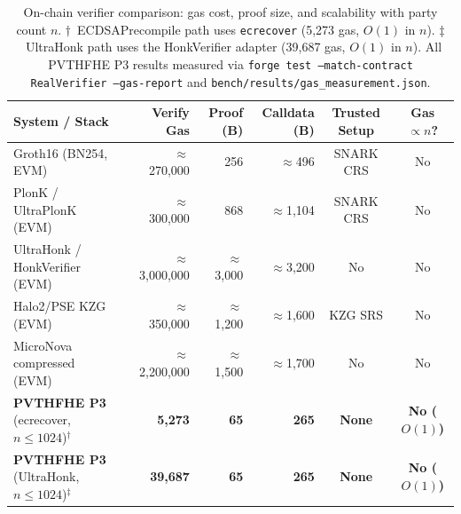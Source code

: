 
\begin{table}[ht]
\centering
\caption{On-chain verifier comparison: gas cost, proof size, and scalability with party count $n$.
  $\dagger$~ECDSAPrecompile path uses \texttt{ecrecover} (5{,}273 gas, $O(1)$ in $n$).
  $\ddagger$~UltraHonk path uses the HonkVerifier adapter (39{,}687 gas, $O(1)$ in $n$).
  All PVTHFHE P3 results measured via \texttt{forge test --match-contract RealVerifier --gas-report}
  and \texttt{bench/results/gas\_measurement.json}.}
\label{tab:p3-bench}
\setlength{\tabcolsep}{6pt}
\begin{tabular}{@{}lrrrcc@{}}
\toprule
\textbf{System / Stack} &
\textbf{Verify Gas} &
\textbf{Proof (B)} &
\textbf{Calldata (B)} &
\textbf{Trusted Setup} &
\textbf{Gas $\propto n$?} \\
\midrule
Groth16 (BN254, EVM)~\cite{groth16}
  & $\approx$270{,}000 & 256  & $\approx$496  & SNARK CRS & No \\
PlonK / UltraPlonK (EVM)~\cite{plonk}
  & $\approx$300{,}000 & 868  & $\approx$1{,}104 & SNARK CRS & No \\
UltraHonk / HonkVerifier (EVM)~\cite{ultraplonk}
  & $\approx$3{,}000{,}000 & $\approx$3{,}000 & $\approx$3{,}200 & No & No \\
Halo2/PSE KZG (EVM)~\cite{halo2}
  & $\approx$350{,}000 & $\approx$1{,}200 & $\approx$1{,}600 & KZG SRS & No \\
MicroNova compressed (EVM)~\cite{micronova}
  & $\approx$2{,}200{,}000 & $\approx$1{,}500 & $\approx$1{,}700 & No & No \\
\midrule
\textbf{PVTHFHE P3} (ecrecover, $n{\le}1024$)$^\dagger$
  & \textbf{5{,}273} & \textbf{65} & \textbf{265} & \textbf{None} & \textbf{No ($O(1)$)} \\
\textbf{PVTHFHE P3} (UltraHonk, $n{\le}1024$)$^\ddagger$
  & \textbf{39{,}687} & \textbf{65} & \textbf{265} & \textbf{None} & \textbf{No ($O(1)$)} \\
\bottomrule
\end{tabular}
\smallskip


\end{table}
